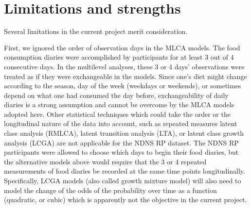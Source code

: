 \section{Limitations and strengths}
 
Several limitations in the current project merit consideration.  

First, we ignored the order of observation days in the MLCA models. The food consumption diaries were accomplished by participants for at least 3 out of 4 consecutive days. In the multilevel analyses, these 3 or 4 days' observations were treated as if they were exchangeable in the models. Since one's diet might change according to the season, day of the week (weekdays or weekends), or sometimes depend on what one had consumed the day before, exchangeability of daily diaries is a strong assumption and cannot be overcome by the MLCA models adopted here. Other statistical techniques which could take the order or the longitudinal nature of the data into account, such as repeated measures latent class analysis (RMLCA), latent transition analysis (LTA)\parencite{collins2010latent}, or latent class growth analysis (LCGA) \parencite{davidian2008growth,jung2008introduction,andruff2009latent} are not applicable for the NDNS RP dataset. The NDNS RP participants were allowed to choose which days to begin their food diaries, but the alternative models above would require that the 3 or 4 repeated measurements of food diaries be recorded at the same time points longitudinally. Specifically, LCGA models (also called growth mixture model) will also need to model the change of the odds of the probability over time as a function (quadratic, or cubic) which is apparently not the objective in the current project.


